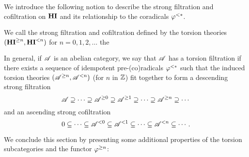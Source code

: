 We introduce the following notion to describe the strong filtration
and cofiltration on $\HI$ and its relationship to the coradicals
$\tlHI{*}$.

\begin{defn}
We call the strong filtration and cofiltration defined by
the torsion theories $(\TGHI{n}{\HI}, \TLHI{n}{\HI})$ for $n = 
0,1,2,\dots$ the 

In general, if $\Cat{A}$ is an abelian category, we say that
$\Cat{A}$ has a torsion filtration if there exists a sequence
of idempotent pre-(co)radicals $\corad{*}$ such that the induced
torsion theories $(\Prerad{n}{\Cat{A}}, \Corad{n}{\Cat{A}})$ (for 
$n$ in $\Z$) fit together to form a descending strong filtration
\[
\Cat{A} \supseteq \cdots \supseteq \Prerad{0}{\Cat{A}} \supseteq
   \Prerad{1}{\Cat{A}} \supseteq \cdots \supseteq \Prerad{n}{\Cat{A}}
   \supseteq \cdots
\]
and an ascending strong cofiltration
\[
0 \subseteq \cdots \subseteq \Corad{0}{\Cat{A}} \subseteq
   \Corad{1}{\Cat{A}} \subseteq \cdots \subseteq \Corad{n}{\Cat{A}}
   \subseteq \cdots.
\]
\end{defn}

We conclude this section by presenting some additional properties 
of the torsion subcategories and the functor $\tgHI{n}$:


